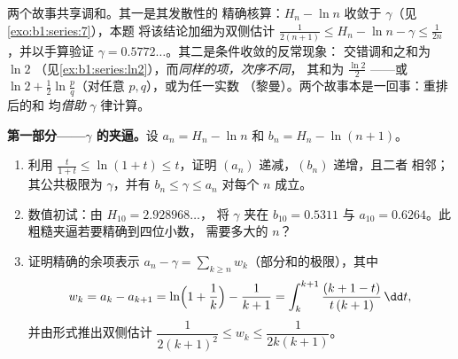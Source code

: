 \begin{problem}[{周末问题——$H_n = \ln n + \gamma +
\frac{1}{2n} + O(n^{-2})$，并将 $1 - \frac12 +
\frac13 - \dots$ 重排为 $\frac{\ln 2}{2}$}]
\label{pb:b1:series:1}
两个故事共享调和。其一是其发散性的
精确核算：$H_n - \ln n$ 收敛于 $\gamma$（见\cref{exo:b1:series:7}），本题
将该结论加细为双侧估计 $\frac{1}{2(n+1)}
\leq H_n - \ln n - \gamma \leq \frac{1}{2n}$，并以手算验证 $\gamma
= 0.5772\dots$。其二是条件收敛的反常现象：
交错调和之和为 $\ln 2$
（见\cref{ex:b1:series:ln2}），而\emph{同样的项，次序不同}，
其和为 $\frac{\ln 2}{2}$ ——或 $\ln 2 +
\frac12\ln\frac pq$（对任意 $p, q$），或为任一实数
（黎曼）。两个故事本是一回事：重排后的和
均\emph{借助} $\gamma$ 律计算。

\medskip
\noindent\textbf{第一部分——$\gamma$ 的夹逼。}设 $a_n = H_n
- \ln n$ 和 $b_n = H_n - \ln(n+1)$。
\begin{enumerate}
  \item 利用 $\frac{t}{1+t} \leq \ln(1 + t) \leq t$，证明
        $(a_n)$ 递减，$(b_n)$ 递增，且二者
        相邻；其公共极限为 $\gamma$，并有 $b_n \leq
        \gamma \leq a_n$ 对每个 $n$ 成立。
  \item 数值初试：由 $H_{10} = 2.928968\dots$，
        将 $\gamma$ 夹在 $b_{10} = 0.5311$ 与 $a_{10} =
        0.6264$。此粗糙夹逼若要精确到四位小数，
        需要多大的 $n$？
  \item 证明精确的余项表示 $a_n - \gamma =
        \sum_{k \geq n} w_k$（部分和的极限），其中
        \[
        w_k = a_k - a_{k+1}
        = \ln\Bigl(1 + \frac1k\Bigr) - \frac{1}{k+1}
        = \int_k^{k+1} \frac{(k + 1 - t)}{t\,(k+1)}\,\dd t ,
        \]
        并由形式推出双侧估计
        $\dfrac{1}{2(k+1)^2} \leq w_k \leq \dfrac{1}{2k(k+1)}$。
\end{enumerate}


\end{problem}
